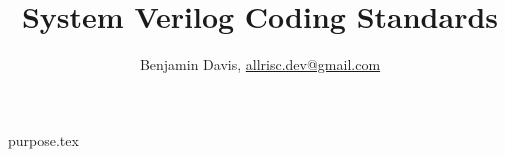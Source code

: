 \documentclass[12pt]{report}
\title{System Verilog Coding Standards}
\author{Benjamin Davis, \href{mailto:allrisc.dev@gmail.com}{allrisc.dev@gmail.com}}
\begin{document}
  \pagestyle{title}
  \maketitle

  \pagestyle{plain}
  \tableofcontents

  {purpose.tex}
\end{document}
